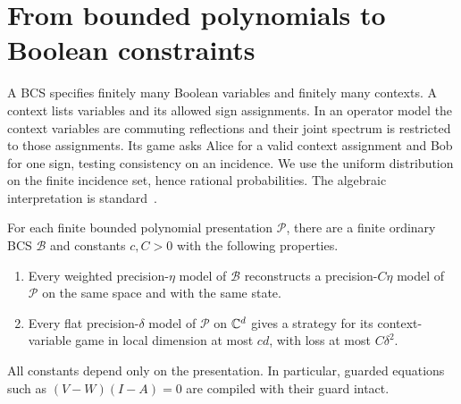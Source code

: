 \section{From bounded polynomials to Boolean constraints}\label{sec:compiler}
A BCS specifies finitely many Boolean variables and finitely many contexts. A context lists variables and its allowed sign assignments. In an operator model the context variables are commuting reflections and their joint spectrum is restricted to those assignments. Its game asks Alice for a valid context assignment and Bob for one sign, testing consistency on an incidence. We use the uniform distribution on the finite incidence set, hence rational probabilities. The algebraic interpretation is standard~\cite{CM14,CLS17}.

\begin{theorem}\label{thm:compiler}
For each finite bounded polynomial presentation $\mathcal P$, there are a finite ordinary BCS $\mathcal B$ and constants $c,C>0$ with the following properties.
\begin{enumerate}[label=(\alph*),leftmargin=*]
\item Every weighted precision-$\eta$ model of $\mathcal B$ reconstructs a precision-$C\eta$ model of $\mathcal P$ on the same space and with the same state.
\item Every flat precision-$\delta$ model of $\mathcal P$ on $\mathbb C^d$ gives a strategy for its context-variable game in local dimension at most $cd$, with loss at most $C\delta^2$.
\end{enumerate}
All constants depend only on the presentation. In particular, guarded equations such as $(V-W)(I-A)=0$ are compiled with their guard intact.
\end{theorem}

